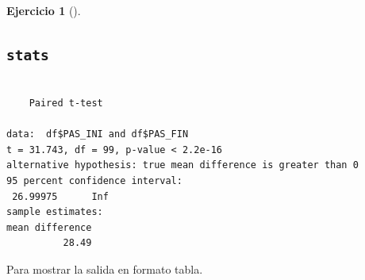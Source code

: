 \documentclass[
  a4paper,
]{scrreport}
\newenvironment{Shaded}{\begin{snugshade}}{\end{snugshade}}
\newcommand{\AttributeTok}[1]{\textcolor[rgb]{0.40,0.45,0.13}{#1}}
\newcommand{\ConstantTok}[1]{\textcolor[rgb]{0.56,0.35,0.01}{#1}}
\newcommand{\FunctionTok}[1]{\textcolor[rgb]{0.28,0.35,0.67}{#1}}
\newcommand{\NormalTok}[1]{\textcolor[rgb]{0.00,0.23,0.31}{#1}}
\newcommand{\SpecialCharTok}[1]{\textcolor[rgb]{0.37,0.37,0.37}{#1}}
\newcommand{\StringTok}[1]{\textcolor[rgb]{0.13,0.47,0.30}{#1}}
\theoremstyle{definition}
\newtheorem{exercise}{Ejercicio}[chapter]
\theoremstyle{remark}
\begin{document}
\begin{exercise}[]
\begin{enumerate}
\begin{tcolorbox}
  \section{\texorpdfstring{\texttt{stats}}{stats}}

\begin{Shaded}
\end{Shaded}

\begin{verbatim}

    Paired t-test

data:  df$PAS_INI and df$PAS_FIN
t = 31.743, df = 99, p-value < 2.2e-16
alternative hypothesis: true mean difference is greater than 0
95 percent confidence interval:
 26.99975      Inf
sample estimates:
mean difference 
          28.49 
\end{verbatim}

  Para mostrar la salida en formato tabla.

\begin{Shaded}
\end{Shaded}


\end{tcolorbox}
\end{enumerate}
\end{exercise}
\end{document}
